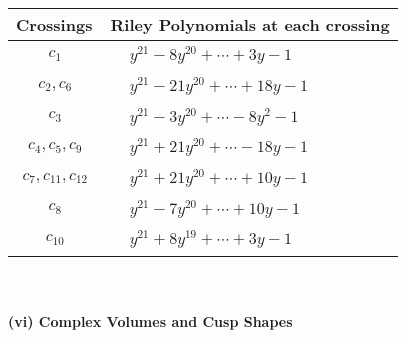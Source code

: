 \documentclass[1p]{elsarticle_modified}
\theoremstyle{definition}
\begin{document}
\begin{tabular}{m{50pt}|m{274pt}}
Crossings & \hspace{64pt}Riley Polynomials at each crossing \\
\hline $$\begin{aligned}c_{1}\end{aligned}$$&$\begin{aligned}
&y^{21}-8 y^{20}+\cdots+3 y-1
\end{aligned}$\\
\hline $$\begin{aligned}c_{2},c_{6}\end{aligned}$$&$\begin{aligned}
&y^{21}-21 y^{20}+\cdots+18 y-1
\end{aligned}$\\
\hline $$\begin{aligned}c_{3}\end{aligned}$$&$\begin{aligned}
&y^{21}-3 y^{20}+\cdots-8 y^2-1
\end{aligned}$\\
\hline $$\begin{aligned}c_{4},c_{5},c_{9}\end{aligned}$$&$\begin{aligned}
&y^{21}+21 y^{20}+\cdots-18 y-1
\end{aligned}$\\
\hline $$\begin{aligned}c_{7},c_{11},c_{12}\end{aligned}$$&$\begin{aligned}
&y^{21}+21 y^{20}+\cdots+10 y-1
\end{aligned}$\\
\hline $$\begin{aligned}c_{8}\end{aligned}$$&$\begin{aligned}
&y^{21}-7 y^{20}+\cdots+10 y-1
\end{aligned}$\\
\hline $$\begin{aligned}c_{10}\end{aligned}$$&$\begin{aligned}
&y^{21}+8 y^{19}+\cdots+3 y-1
\end{aligned}$\\
\hline
\end{tabular}\\~\\
\newpage\flushleft \textbf{(vi) Complex Volumes and Cusp Shapes}
\end{document}
